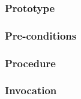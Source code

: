 \def\Subsubsection#1{\subsubsection{#1}
}

\Subsubsection{Prototype}

\Subsubsection{Pre-conditions}

\Subsubsection{Procedure}

\Subsubsection{Invocation}
